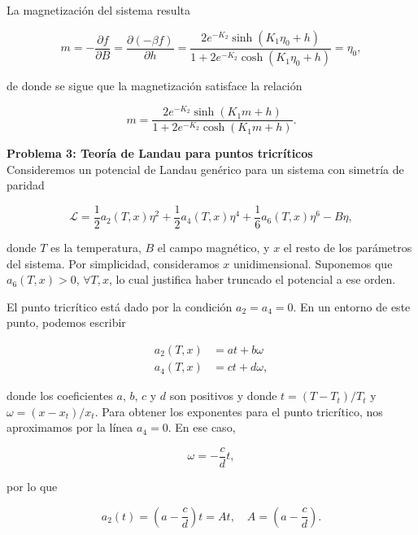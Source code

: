 \documentclass[10pt]{article}
\begin{document}
La magnetizaci\'on del sistema resulta

\begin{equation}
m = -\dfrac{\partial f}{\partial B} = \dfrac{\partial (-\beta f)}{\partial h} = \dfrac{2e^{-K_2}\sinh\left( K_1\eta_0 + h \right)}{1+2e^{-K_2}\cosh\left( K_1\eta_0 + h \right)} = \eta_0,
\end{equation}

de donde se sigue que la magnetizaci\'on satisface la relaci\'on

\begin{equation}
m = \dfrac{2e^{-K_2}\sinh\left( K_1 m + h \right)}{1+2e^{-K_2}\cosh\left( K_1 m + h \right)}.
\end{equation}


\textbf{Problema 3: Teor\'ia de Landau para puntos tricr\'iticos}
\\

Consideremos un potencial de Landau gen\'erico para un sistema con simetr\'ia de paridad

\begin{equation}
\mathcal{L} = \dfrac{1}{2} a_2(T,x) \eta^2 + \dfrac{1}{2} a_4(T,x) \eta^4 + \dfrac{1}{6} a_6(T,x) \eta^6 - B \eta,
\end{equation}

donde $T$ es la temperatura, $B$ el campo magn\'etico, y $x$ el resto de los par\'ametros del sistema. Por simplicidad, consideramos $x$ unidimensional. Suponemos que $a_6(T,x) >0$, $\forall T,x$, lo cual justifica haber truncado el potencial a ese orden.

El punto tricr\'itico est\'a dado por la condici\'on $a_2 = a_4 = 0$. En un entorno de este punto, podemos escribir

\begin{align}
a_2(T,x) &= at + b\omega \\
a_4(T,x) &= ct + d\omega,
\end{align}

donde los coeficientes $a$, $b$, $c$ y $d$ son positivos y donde $t = (T - T_t)/T_t$ y $\omega = (x-x_t)/x_t$. Para obtener los exponentes para el punto tricr\'itico, nos aproximamos por la l\'inea $a_4 = 0$. En ese caso,

\begin{equation}
\omega = -\dfrac{c}{d}t,
\end{equation}

por lo que

\begin{equation}
a_2(t) = \left( a - \dfrac{c}{d}\right) t = A t,\quad A =  \left( a - \dfrac{c}{d}\right).
\end{equation}
\end{document}
